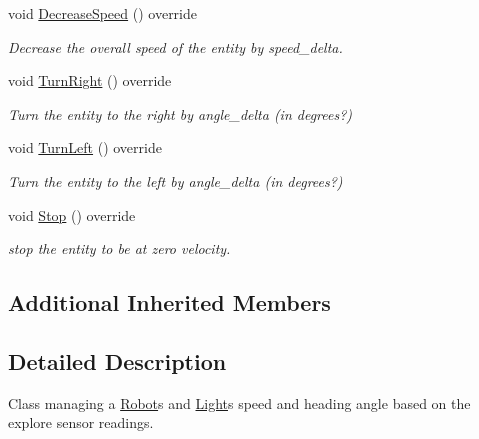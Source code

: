\begin{DoxyCompactItemize}
\mbox{\label{class_motion_handler_robot_explore_a8898051b46761b8ba64468a3afa1bbca}} 
void \mbox{\hyperlink{class_motion_handler_robot_explore_a8898051b46761b8ba64468a3afa1bbca}{Decrease\+Speed}} () override
\begin{DoxyCompactList}\small\item\em Decrease the overall speed of the entity by speed\+\_\+delta. \end{DoxyCompactList}\item 
\mbox{\label{class_motion_handler_robot_explore_a2641f1d587f28f454f0455f6ccc98c3f}} 
void \mbox{\hyperlink{class_motion_handler_robot_explore_a2641f1d587f28f454f0455f6ccc98c3f}{Turn\+Right}} () override
\begin{DoxyCompactList}\small\item\em Turn the entity to the right by angle\+\_\+delta (in degrees?) \end{DoxyCompactList}\item 
\mbox{\label{class_motion_handler_robot_explore_a4abe8735e4f4d22757a544d075885402}} 
void \mbox{\hyperlink{class_motion_handler_robot_explore_a4abe8735e4f4d22757a544d075885402}{Turn\+Left}} () override
\begin{DoxyCompactList}\small\item\em Turn the entity to the left by angle\+\_\+delta (in degrees?) \end{DoxyCompactList}\item 
\mbox{\label{class_motion_handler_robot_explore_a975326a8f0719b6feb48a7aa24afe4ea}} 
void \mbox{\hyperlink{class_motion_handler_robot_explore_a975326a8f0719b6feb48a7aa24afe4ea}{Stop}} () override
\begin{DoxyCompactList}\small\item\em stop the entity to be at zero velocity. \end{DoxyCompactList}\end{DoxyCompactItemize}
\subsection*{Additional Inherited Members}


\subsection{Detailed Description}
Class managing a \mbox{\hyperlink{class_robot}{Robot}}\textquotesingle{}s and \mbox{\hyperlink{class_light}{Light}}\textquotesingle{}s speed and heading angle based on the explore sensor readings. 

